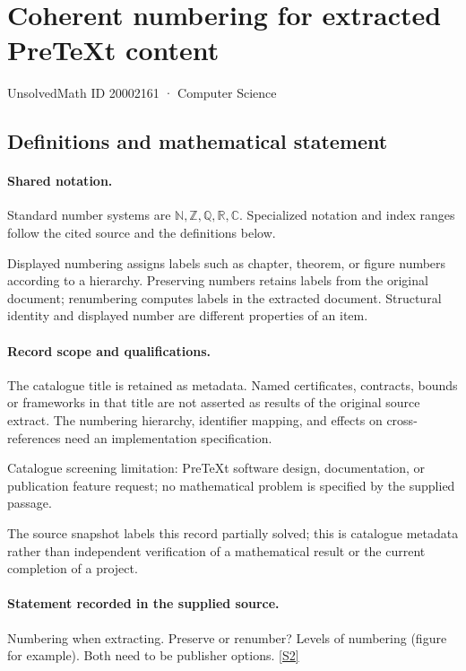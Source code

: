 \documentclass[11pt]{article}
\newcommand{\sref}[2]{\hyperlink{source:#1:#2}{[S#2]}}
\begin{document}
\setcounter{section}{20002160}
\section{Coherent numbering for extracted PreTeXt content}\label{20002161}
{\small\sffamily UnsolvedMath ID 20002161 · Computer Science}
\subsection{Definitions and mathematical statement}

\paragraph{Shared notation.}Standard number systems are $\mathbb N,\mathbb Z,\mathbb Q,\mathbb R,\mathbb C$. Specialized notation and index ranges follow the cited source and the definitions below.


Displayed numbering assigns labels such as chapter, theorem, or figure numbers according to a hierarchy. Preserving numbers retains labels from the original document; renumbering computes labels in the extracted document. Structural identity and displayed number are different properties of an item.
\paragraph{Record scope and qualifications.}
The catalogue title is retained as metadata. Named certificates, contracts, bounds or frameworks in that title are not asserted as results of the original source extract.
The numbering hierarchy, identifier mapping, and effects on cross-references need an implementation specification.

Catalogue screening limitation: PreTeXt software design, documentation, or publication feature request; no mathematical problem is specified by the supplied passage.

The source snapshot labels this record partially solved; this is catalogue metadata rather than independent verification of a mathematical result or the current completion of a project.
\paragraph{Statement recorded in the supplied source.}
Numbering when extracting. Preserve or renumber? Levels of numbering (figure for example). Both need to be publisher options. \sref{20002161}{2}
\end{document}
